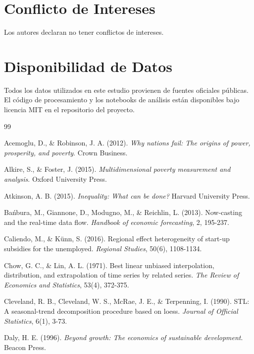 \documentclass[authoryear,12pt]{elsarticle}
\begin{document}
\section*{Conflicto de Intereses}

Los autores declaran no tener conflictos de intereses.

\section*{Disponibilidad de Datos}

Todos los datos utilizados en este estudio provienen de fuentes oficiales públicas. El código de procesamiento y los notebooks de análisis están disponibles bajo licencia MIT en el repositorio del proyecto.


\begin{thebibliography}{99}

Acemoglu, D., \& Robinson, J. A. (2012).
\textit{Why nations fail: The origins of power, prosperity, and poverty}.
Crown Business.

Alkire, S., \& Foster, J. (2015).
\textit{Multidimensional poverty measurement and analysis}.
Oxford University Press.

Atkinson, A. B. (2015).
\textit{Inequality: What can be done?}
Harvard University Press.

Bańbura, M., Giannone, D., Modugno, M., \& Reichlin, L. (2013).
Now-casting and the real-time data flow.
\textit{Handbook of economic forecasting}, 2, 195-237.

Caliendo, M., \& Künn, S. (2016).
Regional effect heterogeneity of start-up subsidies for the unemployed.
\textit{Regional Studies}, 50(6), 1108-1134.

Chow, G. C., \& Lin, A. L. (1971).
Best linear unbiased interpolation, distribution, and extrapolation of time series by related series.
\textit{The Review of Economics and Statistics}, 53(4), 372-375.

Cleveland, R. B., Cleveland, W. S., McRae, J. E., \& Terpenning, I. (1990).
STL: A seasonal-trend decomposition procedure based on loess.
\textit{Journal of Official Statistics}, 6(1), 3-73.

Daly, H. E. (1996).
\textit{Beyond growth: The economics of sustainable development}.
Beacon Press.


\end{thebibliography}
\end{document}
